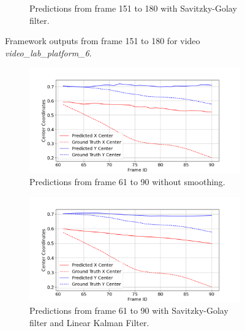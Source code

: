 \documentclass[12pt,oneside]{book} %
\begin{document}
\begin{figure}[H]
\begin{subfigure}[t]{0.9\textwidth}
        \caption{Predictions from frame 151 to 180 with Savitzky-Golay filter.}
        \label{fig:framework-video_lab_platform_6-3-sa}
    \end{subfigure}
    \caption{Framework outputs from frame 151 to 180 for video \textit{video\_lab\_platform\_6}.}
    \label{fig:framework-video_lab_platform_6-3}
\end{figure}

\begin{figure}[H]
    \centering
    \begin{subfigure}[t]{0.9\textwidth}
        \includegraphics[width=\textwidth]{figures/framework/test_indoor1 Raw Data - 1.png}
        \caption{Predictions from frame 61 to 90 without smoothing.}
        \label{fig:framework-test_indoor1-1-raw}
    \end{subfigure}
    \hfill
    \begin{subfigure}[t]{0.9\textwidth}
        \includegraphics[width=\textwidth]{figures/framework/test_indoor1 LKF SA Filter - 1.png}
        \caption{Predictions from frame 61 to 90 with Savitzky-Golay filter and Linear Kalman Filter.}
        \label{fig:framework-test_indoor1-1-sa-lkf}
    \end{subfigure}
    \vfill
    \begin{subfigure}[t]{0.9\textwidth}

\end{subfigure}
\end{figure}
\end{document}
